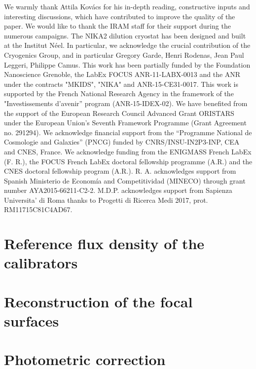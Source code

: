 \documentclass[traditionalabstract]{aa}
\newcommand{\rev}[1]{#1}
\begin{document}
\begin{acknowledgements}
  {\rev We warmly thank Attila Kov\'acs for his in-depth reading,
    constructive inputs and interesting discussions, which have
    contributed to improve the quality of the paper.}
  We would like to thank the IRAM staff for their support during the
  numerous campaigns. 
  The NIKA2 dilution cryostat has been designed and built at the Institut N\'eel. 
  In particular, we acknowledge the crucial contribution of the Cryogenics Group, and 
  in particular Gregory Garde, Henri Rodenas, Jean Paul Leggeri, Philippe Camus. 
  This work has been partially funded by the Foundation Nanoscience
  Grenoble, the LabEx FOCUS ANR-11-LABX-0013 and the ANR under the
  contracts "MKIDS", "NIKA" and ANR-15-CE31-0017. This work is
  supported by the French National Research Agency in the framework of
  the "Investissements d’avenir” program (ANR-15-IDEX-02).
  We have benefited from the support of the European Research Council Advanced
  Grant ORISTARS under the European Union's Seventh Framework
  Programme (Grant Agreement no. 291294). We acknowledge financial
  support from the “Programme National de Cosmologie and Galaxies”
  (PNCG) funded by CNRS/INSU-IN2P3-INP, CEA and CNES, France.
  We acknowledge funding from the ENIGMASS French LabEx (F. R.), the FOCUS French
  LabEx doctoral fellowship programme (A.R.) and the CNES doctoral
  fellowship program (A.R.). R. A. acknowledges support from
  Spanish Ministerio de Econom\'ia and Competitividad (MINECO) through
  grant number AYA2015-66211-C2-2. M.D.P. acknowledges support from
  Sapienza Universita' di Roma thanks to Progetti di Ricerca Medi 2017,
  prot. RM11715C81C4AD67. 
\end{acknowledgements}

%
%

\begin{appendix}
  \section{Reference flux density of the calibrators}
  \label{ap:ref_flux_calibrator}
  
  
  \section{Reconstruction of the focal surfaces}
  \label{ap:focus_surfaces}
  

  \section{Photometric correction}
  \label{se:photometric_correction}
  
\end{appendix}

%
\end{document}
